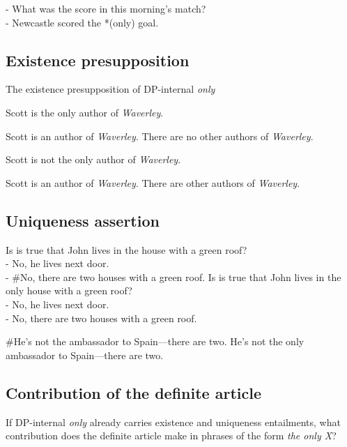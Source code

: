\documentclass{article}
\begin{document}
\begin{exe}
	\ex \label{newcastle} - What was the score in this morning's match? \\
	    - Newcastle scored the *(only) goal.
\end{exe}

\subsection{Existence presupposition}
The existence presupposition of DP-internal \textit{only}

\begin{exe}
	\ex Scott is the only author of \textit{Waverley}.
		\begin{xlist}
			\ex Scott is an author of \textit{Waverley}.
			\ex There are no other authors of \textit{Waverley}.
		\end{xlist}
	\ex Scott is not the only author of \textit{Waverley}.
		\begin{xlist}
			\ex Scott is an author of \textit{Waverley}.
			\ex There are other authors of \textit{Waverley}.
		\end{xlist}
\end{exe}

\subsection{Uniqueness assertion}

\begin{exe}
	\ex Is is true that John lives in the house with a green roof? \\
	    - No, he lives next door. \\
	    - \#No, there are two houses with a green roof.
	\ex Is is true that John lives in the only house with a green roof? \\
	    - No, he lives next door. \\
	    - No, there are two houses with a green roof.
\end{exe}

\begin{exe}
	\ex \#He's not the ambassador to Spain---there are two.
	\ex He's not the only ambassador to Spain---there are two.
\end{exe}

\subsection{Contribution of the definite article}
If DP-internal \textit{only} already carries existence and uniqueness entailments, what contribution does the definite article make in phrases of the form \textit{the only X}?
\end{document}
